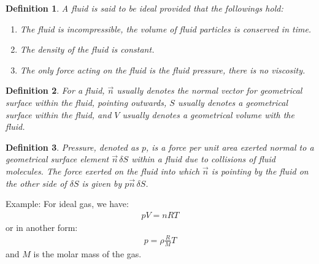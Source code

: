 \documentclass[11pt]{book}
\theoremstyle{break}
\theoremstyle{break}
\newtheorem{defn}{Definition}[corL]
\newcommand{\example}{\color{green}Example: \color{black}}
\begin{document}
\begin{defn}
A fluid is said to be ideal provided that the followings hold:
\begin{enumerate}[topsep=3pt,itemsep=-1ex,partopsep=1ex,parsep=1ex]
\item The fluid is incompressible, the volume of fluid particles is conserved in time.
\item The density of the fluid is constant.
\item The only force acting on the fluid is the fluid pressure, there is no viscosity.
\end{enumerate}
\end{defn}
\begin{defn}
For a fluid, $\vec{n}$ usually denotes the normal vector for geometrical surface within the fluid, pointing outwards, $S$ usually denotes a geometrical surface within the fluid, and $V$ usually denotes a geometrical volume with the fluid. 
\end{defn}

\begin{defn}
Pressure, denoted as $p$, is a force per unit area exerted normal to a geometrical surface element $\vec{n}\, \delta S$ within a fluid due to collisions of fluid molecules. The force exerted on the fluid into which $\vec{n}$ is pointing by the fluid on the other side of $\delta S$ is given by $p\vec{n}\, \delta S$. 
\end{defn}

\example For ideal gas, we have:
\begin{align}
pV = nRT
\end{align}
or in another form:
\begin{align}
p = \rho \frac{R}{M}T
\end{align}
and $M$ is the molar mass of the gas. 



\newpage
\end{document}
